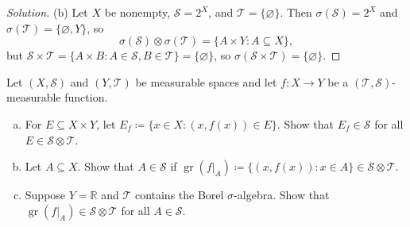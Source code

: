 \documentclass[10pt]{article}
\providecommand{\RR}{\mathbb R}
\providecommand{\ii}{\item}
\newenvironment{soln}{\begin{proof}[Solution]}{\end{proof}}
\providecommand{\gr}{\operatorname{gr}}
\begin{document}
\begin{soln}
    (b) Let $X$ be nonempty, $\mathcal S = 2^X$, and $\mathcal T = \{\varnothing\}$.
    Then $\sigma(\mathcal S) = 2^X$ and
    $\sigma(\mathcal T) = \{\varnothing, Y\}$, so
    \begin{equation*}
        \sigma(\mathcal S)\otimes\sigma(\mathcal T)
	= \{A\times Y : A\subseteq X\},
    \end{equation*}
    but $\mathcal S\times\mathcal T
    = \{A\times B : A\in\mathcal S, B\in\mathcal T\} = \{\varnothing\}$,
    so $\sigma(\mathcal S\times\mathcal T) = \{\varnothing\}$.
\end{soln}

\pagebreak

\begin{problem}
    Let $(X,\mathcal S)$ and $(Y,\mathcal T)$ be measurable spaces
    and let $f\colon X\to Y$ be a $(\mathcal T,\mathcal S)$-measurable function.
    \begin{enumerate}[(a)]
	\ii For $E\subseteq X\times Y$, let $E_f \coloneq \{x\in X: (x,f(x))\in E\}$.
	Show that $E_f\in\mathcal S$ for all $E\in\mathcal S\otimes\mathcal T$.
	\ii Let $A\subseteq X$. Show that $A\in\mathcal S$ if
	$\gr(f|_A) \coloneq \{(x,f(x)) : x\in A\}\in\mathcal S\otimes\mathcal T$.
	\ii Suppose $Y = \RR$ and $\mathcal T$ contains the Borel $\sigma$-algebra.
	Show that $\gr(f|_A)\in\mathcal S\otimes\mathcal T$ for all $A\in\mathcal S$.
    \end{enumerate}
\end{problem}
\end{document}
